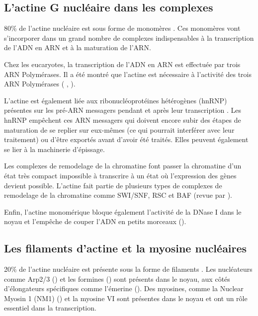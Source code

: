 \subsection{L'actine G nucléaire dans les complexes}

80\% de l'actine nucléaire est sous forme de monomères \cite{mcdonald_nucleoplasmic_2006}. Ces monomères vont s'incorporer dans un grand nombre de complexes indispensables à la transcription de l'ADN en ARN et à la maturation de l'ARN. 

Chez les eucaryotes, la transcription de l'ADN en ARN est effectuée par trois ARN Polymérases. Il a été montré que l'actine est nécessaire à l'activité des trois ARN Polymérases ( \cite{ye_nuclear_2008}, \cite{hofmann_actin_2004} \cite{hu_role_2004}).

L'actine est également liée aux ribonucléoprotéines hétérogènes (hnRNP) présentes sur les pré-ARN messagers pendant et après leur transcription \cite{kukalev_actin_2005}. Les hnRNP empêchent ces ARN messagers qui doivent encore subir des étapes de maturation de se replier sur eux-mêmes (ce qui pourrait interférer avec leur traitement) ou d'être exportés avant d'avoir été traités. Elles peuvent également se lier à la machinerie d'épissage. 

Les complexes de remodelage de la chromatine font passer la chromatine d'un état très compact impossible à transcrire à un état où l'expression des gènes devient possible. L'actine fait partie de plusieurs types de complexes de remodelage de la chromatine comme SWI/SNF, RSC et BAF (revue par \cite{farrants_chromatin_2008}). 

Enfin, l'actine monomérique bloque également l'activité de la DNase I dans le noyau et l'empêche de couper l'ADN en petits morceaux (\cite{lazarides_actin_1974}). 

\subsection{Les filaments d'actine et la myosine nucléaires}

20\% de l'actine nucléaire est présente sous la forme de filaments \cite{mcdonald_nucleoplasmic_2006}. Les nucléateurs comme Arp2/3 (\cite{yoo_novel_2006}) et les formines (\cite{baarlink_nuclear_2013}) sont présents dans le noyau, aux côtés d'élongateurs spécifiques comme l'émerine (\cite{ho_lamin_2013}). 
Des myosines, comme la Nuclear Myosin 1 (NM1) (\cite{nowak_evidence_1997})  et la myosine VI sont présentes dans le noyau et ont un rôle essentiel dans la transcription. 

